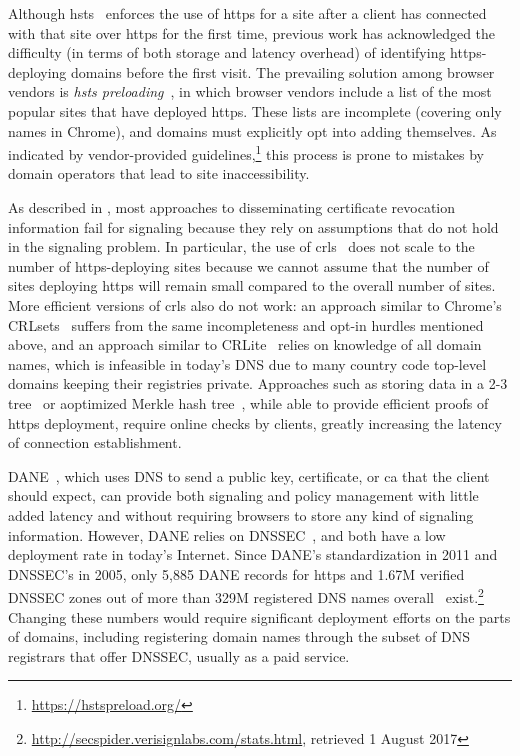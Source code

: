 Although \ac{hsts}~\cite{rfc6797} enforces the use of \ac{https} for a site
after a client has connected with that site over \ac{https} for the first time,
previous work has acknowledged the difficulty (in terms of both storage and
latency overhead) of identifying \ac{https}-deploying domains before the first
visit. The prevailing solution among browser vendors is \emph{\ac{hsts}
preloading}~\cite{keeler2012preloading}, in which browser vendors include a list
of the most popular sites that have deployed \ac{https}. These lists are
incomplete (covering only  names in Chrome), and domains
must explicitly opt into adding themselves. As indicated by vendor-provided
guidelines,\footnote{\url{https://hstspreload.org/}} this process is prone to
mistakes by domain operators that lead to site inaccessibility.

As described in ,
most approaches to disseminating certificate revocation information fail for
signaling because they rely on assumptions that do not hold in the signaling
problem. In particular, the use of \acp{crl}~\cite{rfc5280} does not scale to
the number of \ac{https}-deploying sites because we cannot assume that the
number of sites deploying \ac{https} will remain small compared to the overall
number of sites. More efficient versions of \acp{crl} also do not work: an
approach similar to Chrome's CRLsets~\cite{langley2012revocation} suffers from
the same incompleteness and opt-in hurdles mentioned above, and an approach
similar to CRLite~\cite{larisch2017crlite} relies on knowledge of all domain
names, which is infeasible in today's DNS due to many country code top-level
domains keeping their registries private. Approaches such as storing data in a
2-3 tree~\cite{naor1998certificate} or aoptimized Merkle hash
tree~\cite{laurie2012revocation}, while able to provide efficient proofs of
\ac{https} deployment, require online checks by clients, greatly increasing the
latency of connection establishment.

DANE~\cite{rfc6698}, which uses DNS to send a public key, certificate, or
\ac{ca} that the client should expect, can provide both signaling and policy
management with little added latency and without requiring browsers to store any
kind of signaling information. However, DANE relies on DNSSEC~\cite{rfc4033},
and both have a low deployment rate in today's Internet. Since DANE's
standardization in 2011 and DNSSEC's in 2005, only 5,885 DANE records for
\ac{https} and 1.67M verified DNSSEC zones out of more than 329M registered DNS
names overall~\cite{dnib-14-1}
exist.\footnote{\url{http://secspider.verisignlabs.com/stats.html}, retrieved 1
August 2017} Changing these numbers would require significant deployment efforts
on the parts of domains, including registering domain names through the subset
of DNS registrars that offer DNSSEC, usually as a paid service.
